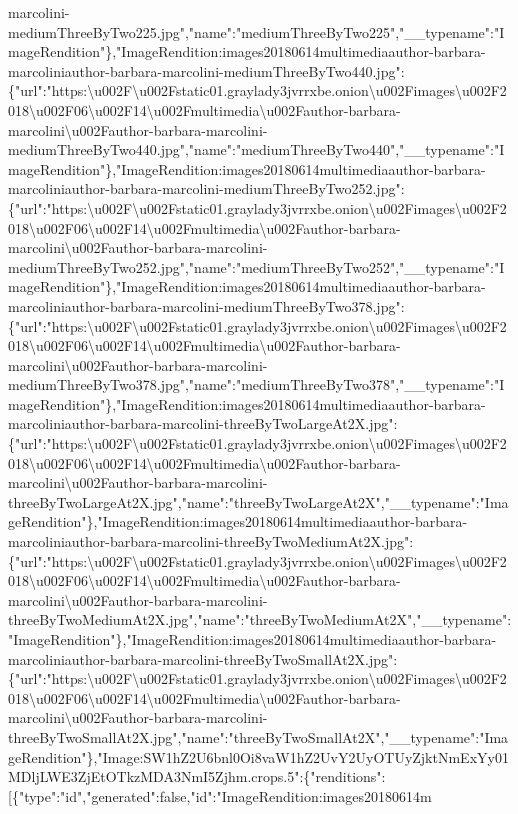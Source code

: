 marcolini-mediumThreeByTwo225.jpg","name":"mediumThreeByTwo225","\_\_typename":"ImageRendition"\},"ImageRendition:images20180614multimediaauthor-barbara-marcoliniauthor-barbara-marcolini-mediumThreeByTwo440.jpg":\{"url":"https:\textbackslash{}u002F\textbackslash{}u002Fstatic01.graylady3jvrrxbe.onion\textbackslash{}u002Fimages\textbackslash{}u002F2018\textbackslash{}u002F06\textbackslash{}u002F14\textbackslash{}u002Fmultimedia\textbackslash{}u002Fauthor-barbara-marcolini\textbackslash{}u002Fauthor-barbara-marcolini-mediumThreeByTwo440.jpg","name":"mediumThreeByTwo440","\_\_typename":"ImageRendition"\},"ImageRendition:images20180614multimediaauthor-barbara-marcoliniauthor-barbara-marcolini-mediumThreeByTwo252.jpg":\{"url":"https:\textbackslash{}u002F\textbackslash{}u002Fstatic01.graylady3jvrrxbe.onion\textbackslash{}u002Fimages\textbackslash{}u002F2018\textbackslash{}u002F06\textbackslash{}u002F14\textbackslash{}u002Fmultimedia\textbackslash{}u002Fauthor-barbara-marcolini\textbackslash{}u002Fauthor-barbara-marcolini-mediumThreeByTwo252.jpg","name":"mediumThreeByTwo252","\_\_typename":"ImageRendition"\},"ImageRendition:images20180614multimediaauthor-barbara-marcoliniauthor-barbara-marcolini-mediumThreeByTwo378.jpg":\{"url":"https:\textbackslash{}u002F\textbackslash{}u002Fstatic01.graylady3jvrrxbe.onion\textbackslash{}u002Fimages\textbackslash{}u002F2018\textbackslash{}u002F06\textbackslash{}u002F14\textbackslash{}u002Fmultimedia\textbackslash{}u002Fauthor-barbara-marcolini\textbackslash{}u002Fauthor-barbara-marcolini-mediumThreeByTwo378.jpg","name":"mediumThreeByTwo378","\_\_typename":"ImageRendition"\},"ImageRendition:images20180614multimediaauthor-barbara-marcoliniauthor-barbara-marcolini-threeByTwoLargeAt2X.jpg":\{"url":"https:\textbackslash{}u002F\textbackslash{}u002Fstatic01.graylady3jvrrxbe.onion\textbackslash{}u002Fimages\textbackslash{}u002F2018\textbackslash{}u002F06\textbackslash{}u002F14\textbackslash{}u002Fmultimedia\textbackslash{}u002Fauthor-barbara-marcolini\textbackslash{}u002Fauthor-barbara-marcolini-threeByTwoLargeAt2X.jpg","name":"threeByTwoLargeAt2X","\_\_typename":"ImageRendition"\},"ImageRendition:images20180614multimediaauthor-barbara-marcoliniauthor-barbara-marcolini-threeByTwoMediumAt2X.jpg":\{"url":"https:\textbackslash{}u002F\textbackslash{}u002Fstatic01.graylady3jvrrxbe.onion\textbackslash{}u002Fimages\textbackslash{}u002F2018\textbackslash{}u002F06\textbackslash{}u002F14\textbackslash{}u002Fmultimedia\textbackslash{}u002Fauthor-barbara-marcolini\textbackslash{}u002Fauthor-barbara-marcolini-threeByTwoMediumAt2X.jpg","name":"threeByTwoMediumAt2X","\_\_typename":"ImageRendition"\},"ImageRendition:images20180614multimediaauthor-barbara-marcoliniauthor-barbara-marcolini-threeByTwoSmallAt2X.jpg":\{"url":"https:\textbackslash{}u002F\textbackslash{}u002Fstatic01.graylady3jvrrxbe.onion\textbackslash{}u002Fimages\textbackslash{}u002F2018\textbackslash{}u002F06\textbackslash{}u002F14\textbackslash{}u002Fmultimedia\textbackslash{}u002Fauthor-barbara-marcolini\textbackslash{}u002Fauthor-barbara-marcolini-threeByTwoSmallAt2X.jpg","name":"threeByTwoSmallAt2X","\_\_typename":"ImageRendition"\},"Image:SW1hZ2U6bnl0Oi8vaW1hZ2UvY2UyOTUyZjktNmExYy01MDljLWE3ZjEtOTkzMDA3NmI5Zjhm.crops.5":\{"renditions":{[}\{"type":"id","generated":false,"id":"ImageRendition:images20180614m